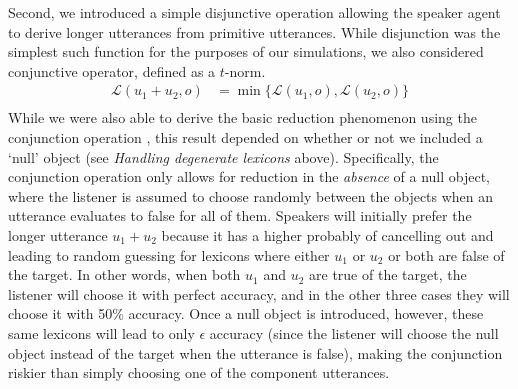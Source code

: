 \documentclass[11pt, floatsintext]{apa6}
\begin{document}
Second, we introduced a simple disjunctive operation allowing the speaker agent to derive longer utterances from primitive utterances.  
While disjunction was the simplest such function for the purposes of our simulations, we also considered conjunctive operator, defined as a $t$-norm.
\begin{align}
\mathcal{L}(u_1+u_2, o) & = \min\{\mathcal{L}(u_1, o), \mathcal{L}(u_2, o)\} \nonumber\\
\end{align}
While we were also able to derive the basic reduction phenomenon using the conjunction operation \cite{hawkins_convention-formation_2017,hawkins2020generalizing}, this result depended on whether or not we included a `null' object (see \emph{Handling degenerate lexicons} above). 
Specifically, the conjunction operation only allows for reduction in the \emph{absence} of a null object, where the listener is assumed to choose randomly between the objects when an utterance evaluates to false for all of them.
Speakers will initially prefer the longer utterance $u_1+u_2$ because it has a higher probably of cancelling out and leading to random guessing for lexicons where either $u_1$ or $u_2$ or both are false of the target.
In other words, when both $u_1$ and $u_2$ are true of the target, the listener will choose it with perfect accuracy, and in the other three cases they will choose it with 50\% accuracy.
Once a null object is introduced, however, these same lexicons will lead to only $\epsilon$ accuracy (since the listener will choose the null object instead of the target when the utterance is false), making the conjunction riskier than simply choosing one of the component utterances.
\end{document}
